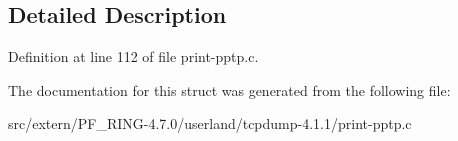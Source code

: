 \subsection{Detailed Description}


Definition at line 112 of file print-\/pptp.c.



The documentation for this struct was generated from the following file:\begin{DoxyCompactItemize}
\item 
src/extern/PF\_\-RING-\/4.7.0/userland/tcpdump-\/4.1.1/print-\/pptp.c\end{DoxyCompactItemize}
